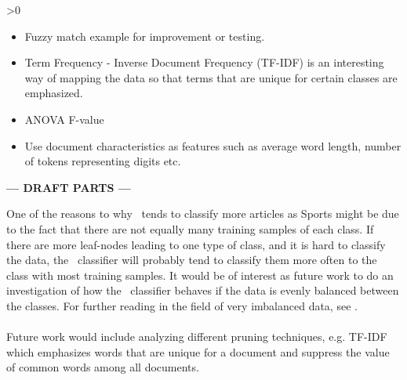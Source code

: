 \ifnum\printdraft>0
	\begin{itemize}
		\item Fuzzy match example for improvement or testing.
		\item Term Frequency - Inverse Document Frequency (TF-IDF) is an interesting way of mapping the data so that terms that are unique for certain classes are emphasized.
		\item ANOVA F-value
		\item Use document characteristics as features such as average word length, number of tokens representing digits etc.
	\end{itemize}
\else
\begin{center}
	\textbf{--- DRAFT PARTS ---}
\end{center}
\fi

One of the reasons to why \rf\ tends to classify more articles as Sports might be due to the fact that there are not equally many training samples of each class. If there are more leaf-nodes leading to one type of class, and it is hard to classify the data, the \rf\ classifier will probably tend to classify them more often to the class with most training samples. It would be of interest as future work to do an investigation of how the \rf\ classifier behaves if the data is evenly balanced between the classes. For further reading in the field of very imbalanced data, see \cite{Chen}.
\\\\
Future work would include analyzing different pruning techniques, e.g. TF-IDF which emphasizes words that are unique for a document and suppress the value of common words among all documents. 
